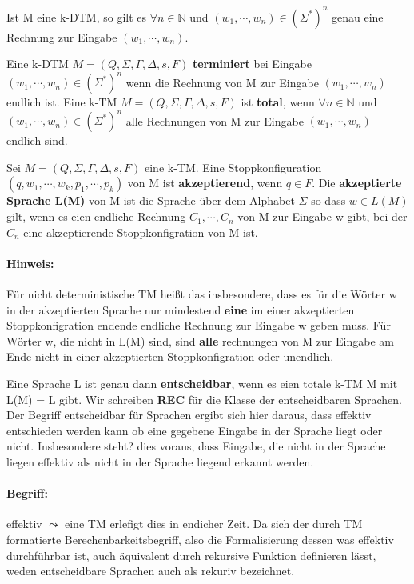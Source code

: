   Ist M eine k-DTM, so gilt es \(\forall n \in \mathbb{N}\) und \((w_1, \cdots, w_n) \in (\Sigma^*)^n\) genau eine Rechnung zur Eingabe \((w_1, \cdots, w_n)\).

  Eine k-DTM \(M = (Q, \Sigma, \Gamma, \Delta, s, F)\) \textbf{terminiert} bei Eingabe \((w_1, \cdots, w_n) \in (\Sigma^*)^n\) wenn die Rechnung von M zur Eingabe \((w_1, \cdots, w_n)\) endlich ist. Eine k-TM \(M = (Q, \Sigma, \Gamma, \Delta, s, F)\) ist \textbf{total}, wenn \(\forall n \in \mathbb{N}\) und \((w_1, \cdots, w_n) \in (\Sigma^*)^n\) alle Rechnungen von M zur Eingabe \((w_1, \cdots, w_n)\) endlich sind.

  Sei \(M = (Q, \Sigma, \Gamma, \Delta, s, F)\) eine k-TM. Eine Stoppkonfiguration \((q, w_1, \cdots, w_k, p_1, \cdots, p_k)\) von M ist \textbf{akzeptierend}, wenn \(q \in F\). Die \textbf{akzeptierte Sprache L(M)} von M ist die Sprache über dem Alphabet \(\Sigma\) so dass \(w \in L(M)\) gilt, wenn es eien endliche Rechnung \(C_1, \cdots, C_n\) von M zur Eingabe w gibt, bei der \(C_n\) eine akzeptierende Stoppkonfigration von M ist. 

\paragraph*{Hinweis: } 
  Für nicht deterministische TM heißt das insbesondere, dass es für die Wörter w in der  akzeptierten Sprache nur mindestend \textbf{eine} im einer akzeptierten Stoppkonfigration endende endliche Rechnung zur Eingabe w geben muss. Für Wörter w, die nicht in L(M) sind, sind \textbf{alle} rechnungen von M zur Eingabe am Ende nicht in einer akzeptierten Stoppkonfigration oder unendlich.

  Eine Sprache L ist genau dann \textbf{entscheidbar}, wenn es eien totale k-TM M mit L(M) = L gibt. Wir schreiben \textbf{REC} für die Klasse der entscheidbaren Sprachen. Der Begriff entscheidbar für Sprachen ergibt sich hier daraus, dass effektiv entschieden werden kann ob eine gegebene Eingabe in der Sprache liegt oder nicht. Insbesondere steht? dies voraus, dass Eingabe, die nicht in der Sprache liegen effektiv als nicht in der Sprache liegend erkannt werden. 
\paragraph*{Begriff: } 
  effektiv \(\leadsto\) eine TM erlefigt dies in endicher Zeit. Da sich der durch TM formatierte  Berechenbarkeitsbegriff, also die Formalisierung dessen was effektiv durchführbar ist, auch äquivalent durch rekursive Funktion definieren lässt, weden entscheidbare Sprachen auch als rekuriv bezeichnet.

